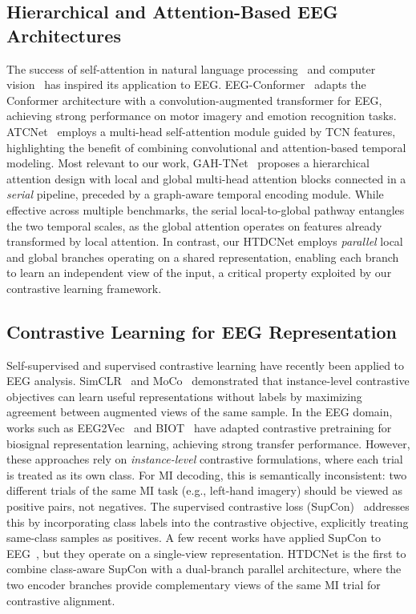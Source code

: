 \documentclass[conference]{IEEEtran}
\begin{document}
\subsection{Hierarchical and Attention-Based EEG Architectures}
The success of self-attention in natural language processing~\cite{vaswani2017attention} and computer vision~\cite{dosovitskiy2020vit} has inspired its application to EEG.
EEG-Conformer~\cite{song2023eeg} adapts the Conformer architecture with a convolution-augmented transformer for EEG, achieving strong performance on motor imagery and emotion recognition tasks.
ATCNet~\cite{altaheri2023atcnet} employs a multi-head self-attention module guided by TCN features, highlighting the benefit of combining convolutional and attention-based temporal modeling.
Most relevant to our work, GAH-TNet~\cite{altuwairqi2022gah} proposes a hierarchical attention design with local and global multi-head attention blocks connected in a \emph{serial} pipeline, preceded by a graph-aware temporal encoding module.
While effective across multiple benchmarks, the serial local-to-global pathway entangles the two temporal scales, as the global attention operates on features already transformed by local attention.
In contrast, our HTDCNet employs \emph{parallel} local and global branches operating on a shared representation, enabling each branch to learn an independent view of the input, a critical property exploited by our contrastive learning framework.

\subsection{Contrastive Learning for EEG Representation}
Self-supervised and supervised contrastive learning have recently been applied to EEG analysis.
SimCLR~\cite{chen2020simclr} and MoCo~\cite{he2020moco} demonstrated that instance-level contrastive objectives can learn useful representations without labels by maximizing agreement between augmented views of the same sample.
In the EEG domain, works such as EEG2Vec~\cite{mohan2024eeg2vec} and BIOT~\cite{yang2024biot} have adapted contrastive pretraining for biosignal representation learning, achieving strong transfer performance.
However, these approaches rely on \emph{instance-level} contrastive formulations, where each trial is treated as its own class.
For MI decoding, this is semantically inconsistent: two different trials of the same MI task (e.g., left-hand imagery) should be viewed as positive pairs, not negatives.
The supervised contrastive loss (SupCon)~\cite{khosla2020supcon} addresses this by incorporating class labels into the contrastive objective, explicitly treating same-class samples as positives.
A few recent works have applied SupCon to EEG~\cite{li2023eegsupcon}, but they operate on a single-view representation.
HTDCNet is the first to combine class-aware SupCon with a dual-branch parallel architecture, where the two encoder branches provide complementary views of the same MI trial for contrastive alignment.
\end{document}
